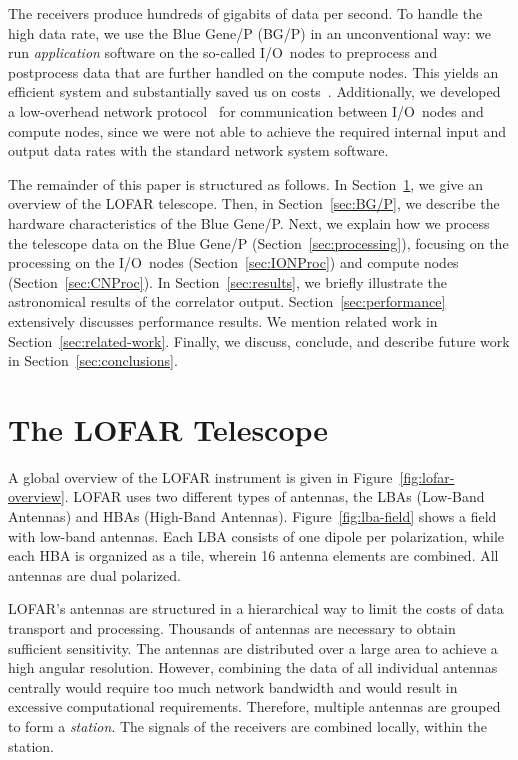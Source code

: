 \documentclass{sig-alternate}
\begin{document}
The receivers produce hundreds of gigabits of data per second.
To handle the high data rate,
we use the Blue Gene/P (BG/P) in an unconventional way: we run
\emph{application\/} software on the so-called I/O~nodes to preprocess and
postprocess data that are further handled on the compute nodes.
This yields an efficient system and substantially saved us on
costs~\cite{Iskra:08}.
Additionally, we developed a low-overhead network protocol~\cite{Romein:09a}
for communication between I/O~nodes and compute nodes, since we were not able
to achieve the required internal input and output data rates with the standard
network system software.

The remainder of this paper is structured as follows.
In Section~\ref{sec:overview}, we give an overview of the LOFAR telescope.
Then, in Section~\ref{sec:BG/P}, we describe the hardware characteristics of
the Blue Gene/P.
Next, we explain how we process the telescope data on the Blue Gene/P
(Section~\ref{sec:processing}), focusing on the processing on the I/O~nodes
(Section~\ref{sec:IONProc}) and compute nodes (Section~\ref{sec:CNProc}).
In Section~\ref{sec:results}, we briefly illustrate the astronomical results
of the correlator output.
Section~\ref{sec:performance} extensively discusses performance results.
We mention related work in Section~\ref{sec:related-work}.
Finally, we discuss, conclude, and describe future work in
Section~\ref{sec:conclusions}.


\section{The LOFAR Telescope}
\label{sec:overview}

A global overview of the LOFAR instrument is given in
Figure~\ref{fig:lofar-overview}. LOFAR uses two different types of
antennas, the LBAs (Low-Band Antennas) and HBAs (High-Band Antennas).
Figure~\ref{fig:lba-field} shows a field with low-band antennas. Each
LBA consists of one dipole per polarization, while each HBA is
organized as a tile, wherein 16 antenna elements are combined. All
antennas are dual polarized.

LOFAR's antennas are structured in a hierarchical way to limit the
costs of data transport and processing. Thousands of antennas are
necessary to obtain sufficient sensitivity. The antennas are
distributed over a large area to achieve a high angular resolution.
However, combining the data of all individual antennas centrally would
require too much network bandwidth and would result in excessive
computational requirements. Therefore, multiple antennas are grouped
to form a \emph{station}.
The signals of the receivers are combined locally, within the station.
\end{document}
